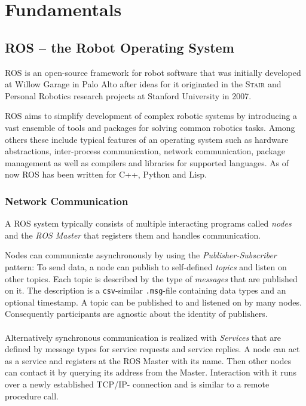 \chapter{Fundamentals}
\label{Fundamentals chapter}
\section{ROS -- the Robot Operating System}
ROS is an open-source framework for robot software that was initially developed at Willow Garage in Palo Alto after ideas for it originated in the \textsc{Stair} and Personal Robotics research projects at Stanford University in 2007. 

ROS aims to simplify development of complex robotic systems by introducing a vast ensemble of tools and packages for solving common robotics tasks. Among others these include typical features of an operating system such as hardware abstractions, inter-process communication, network communication, package management as well as compilers and libraries for supported languages. As of now ROS has been written for C++, Python and Lisp.

\subsection{Network Communication}
A ROS system typically consists of multiple interacting programs called \textit{nodes} and the \textit{ROS Master} that registers them and handles communication.

Nodes can communicate asynchronously by using the \textit{Publisher-Subscriber} pattern: To send data, a node can publish to self-defined \textit{topics} and listen on other topics. Each topic is described by the type of \textit{messages} that are published on it. The description is a \texttt{csv}-similar \texttt{.msg}-file containing data types and an optional timestamp.
A topic can be published to and listened on by many nodes. Consequently participants are agnostic about the identity of publishers.
\\\\
Alternatively synchronous communication is realized with \textit{Services} that are defined by message types for service requests and service replies. A node can act as a service and registers at the ROS Master with its name. Then other nodes can contact it by querying its address from the Master. Interaction with it runs over a newly established TCP/IP- connection and is similar to a remote procedure call.


